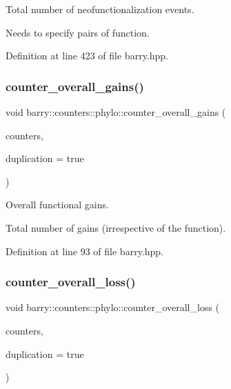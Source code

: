 Total number of neofunctionalization events. 

Needs to specify pairs of function. 

Definition at line 423 of file barry.\+hpp.

\mbox{\label{namespacebarry_1_1counters_1_1phylo_ae1e599324d656660ce8730b77efcbcce}} 
\subsubsection{\texorpdfstring{counter\+\_\+overall\+\_\+gains()}{counter\_overall\_gains()}}
{\footnotesize\ttfamily void barry\+::counters\+::phylo\+::counter\+\_\+overall\+\_\+gains (\begin{DoxyParamCaption}\item[{\hyperlink{namespacebarry_1_1counters_1_1phylo_a4e401ffe66d04091343dcffaf915f8c3}{Phylo\+Counters} $\ast$}]{counters,  }\item[{bool}]{duplication = {\ttfamily true} }\end{DoxyParamCaption})\hspace{0.3cm}{\ttfamily [inline]}}



Overall functional gains. 

Total number of gains (irrespective of the function). 

Definition at line 93 of file barry.\+hpp.

\mbox{\label{namespacebarry_1_1counters_1_1phylo_a79ccde09af0d3d47b1a3162a16bc4597}} 
\subsubsection{\texorpdfstring{counter\+\_\+overall\+\_\+loss()}{counter\_overall\_loss()}}
{\footnotesize\ttfamily void barry\+::counters\+::phylo\+::counter\+\_\+overall\+\_\+loss (\begin{DoxyParamCaption}\item[{\hyperlink{namespacebarry_1_1counters_1_1phylo_a4e401ffe66d04091343dcffaf915f8c3}{Phylo\+Counters} $\ast$}]{counters,  }\item[{bool}]{duplication = {\ttfamily true} }\end{DoxyParamCaption})\hspace{0.3cm}{\ttfamily [inline]}}



